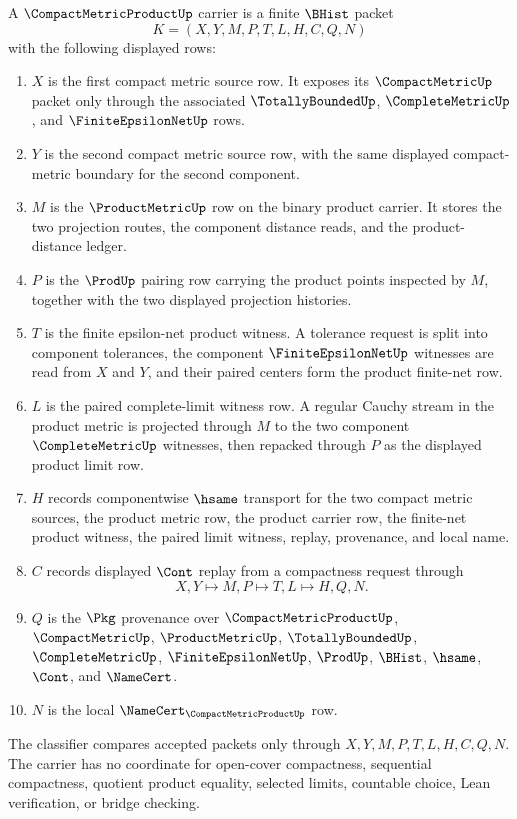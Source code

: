 \begin{definition}\label{def:compact-metric-product-carrier}
A $\CompactMetricProductUp$ carrier is a finite $\BHist$ packet
$$
K=(X,Y,M,P,T,L,H,C,Q,N)
$$
with the following displayed rows:
\begin{enumerate}
\item $X$ is the first compact metric source row. It exposes its $\CompactMetricUp$ packet only through the associated $\TotallyBoundedUp$, $\CompleteMetricUp$, and $\FiniteEpsilonNetUp$ rows.
\item $Y$ is the second compact metric source row, with the same displayed compact-metric boundary for the second component.
\item $M$ is the $\ProductMetricUp$ row on the binary product carrier. It stores the two projection routes, the component distance reads, and the product-distance ledger.
\item $P$ is the $\ProdUp$ pairing row carrying the product points inspected by $M$, together with the two displayed projection histories.
\item $T$ is the finite epsilon-net product witness. A tolerance request is split into component tolerances, the component $\FiniteEpsilonNetUp$ witnesses are read from $X$ and $Y$, and their paired centers form the product finite-net row.
\item $L$ is the paired complete-limit witness row. A regular Cauchy stream in the product metric is projected through $M$ to the two component $\CompleteMetricUp$ witnesses, then repacked through $P$ as the displayed product limit row.
\item $H$ records componentwise $\hsame$ transport for the two compact metric sources, the product metric row, the product carrier row, the finite-net product witness, the paired limit witness, replay, provenance, and local name.
\item $C$ records displayed $\Cont$ replay from a compactness request through
$$
X,Y \longmapsto M,P \longmapsto T,L \longmapsto H,Q,N .
$$
\item $Q$ is the $\Pkg$ provenance over $\CompactMetricProductUp$, $\CompactMetricUp$, $\ProductMetricUp$, $\TotallyBoundedUp$, $\CompleteMetricUp$, $\FiniteEpsilonNetUp$, $\ProdUp$, $\BHist$, $\hsame$, $\Cont$, and $\NameCert$.
\item $N$ is the local $\NameCert_{\CompactMetricProductUp}$ row.
\end{enumerate}
The classifier compares accepted packets only through $X,Y,M,P,T,L,H,C,Q,N$. The carrier has no coordinate for open-cover compactness, sequential compactness, quotient product equality, selected limits, countable choice, Lean verification, or bridge checking.
\end{definition}


